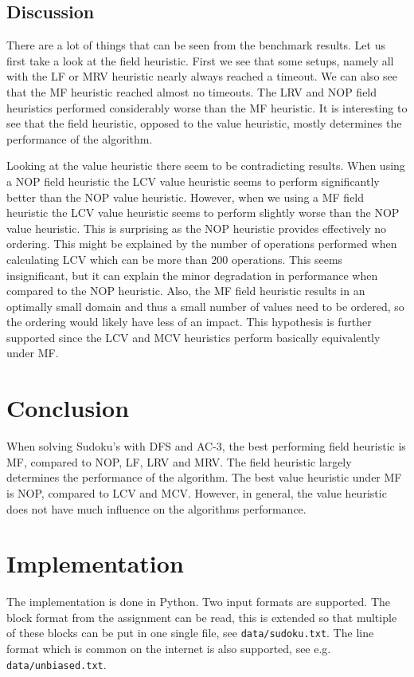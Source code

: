 \documentclass[a4paper]{article}
\begin{document}
\subsection{Discussion}
There are a lot of things that can be seen from the benchmark results. Let us
first take a look at the field heuristic. First we see that some setups, namely
all with the LF or MRV heuristic nearly always reached a timeout. We can also
see that the MF heuristic reached almost no timeouts. The LRV and NOP field
heuristics performed considerably worse than the MF heuristic. It is
interesting to see that the field heuristic, opposed to the value heuristic,
mostly determines the performance of the algorithm.

Looking at the value heuristic there seem to be contradicting results. When
using a NOP field heuristic the LCV value heuristic seems to perform
significantly better than the NOP value heuristic. However, when we using a MF
field heuristic the LCV value heuristic seems to perform slightly worse than
the NOP value heuristic. This is surprising as the NOP heuristic provides
effectively no ordering. This might be explained by the number of operations
performed when calculating LCV which can be more than 200 operations. This
seems insignificant, but it can explain the minor degradation in performance
when compared to the NOP heuristic. Also, the MF field heuristic results in an
optimally small domain and thus a small number of values need to be ordered, so
the ordering would likely have less of an impact. This hypothesis is further
supported since the LCV and MCV heuristics perform basically equivalently under
MF.

\section{Conclusion}
When solving Sudoku's with DFS and AC-3, the best performing field heuristic is
MF, compared to NOP, LF, LRV and MRV. The field heuristic largely determines
the performance of the algorithm. The best value heuristic under MF is NOP,
compared to LCV and MCV. However, in general, the value heuristic does not have
much influence on the algorithms performance.

\appendix
\section{Implementation}
The implementation is done in Python. Two input formats are supported. The
block format from the assignment can be read, this is extended so that multiple
of these blocks can be put in one single file, see \texttt{data/sudoku.txt}.
The line format which is common on the internet is also supported, see e.g.
\texttt{data/unbiased.txt}.
\end{document}

